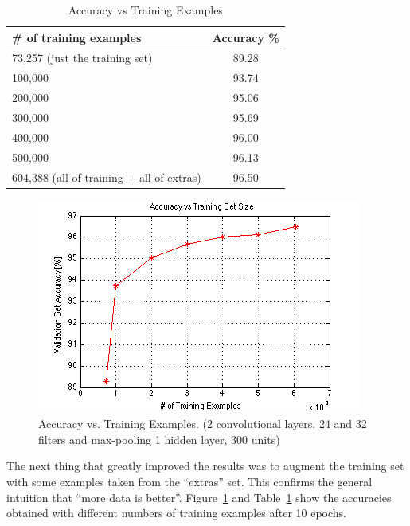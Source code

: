 \documentclass{article} %
\begin{document}
\begin{center}
\begin{table}[!h]
  \begin{tabular}{ | l || c ||}
    \hline
    \# of training examples & Accuracy \% \\ \hline \hline
    73,257 (just the training set) & 89.28 \\ \hline
    100,000 & 93.74 \\ \hline
    200,000 & 95.06 \\ \hline
    300,000 & 95.69 \\ \hline
    400,000 & 96.00 \\ \hline
    500,000 & 96.13 \\ \hline
    604,388 (all of training + all of extras) & 96.50 \\ \hline
  \end{tabular}
  \caption{Accuracy vs Training Examples}
  \label{table:train}
  \end{table}
\end{center}

\begin{center}
\begin{figure}[!htb]
  \includegraphics[width=0.8\linewidth]{images/image05}
  \caption{Accuracy vs. Training Examples. (2 convolutional layers, 24 and 32 filters and max-pooling 1 hidden layer, 300 units)}
  \label{fig:accuracy}
\end{figure}
\end{center}


The next thing that greatly improved the results was to augment the training set with some examples taken from the “extras” set. This confirms the general intuition that “more data is better”.  Figure~\ref{fig:accuracy} and Table~\ref{table:train} show the accuracies obtained with different numbers of training examples after 10 epochs.
\end{document}
